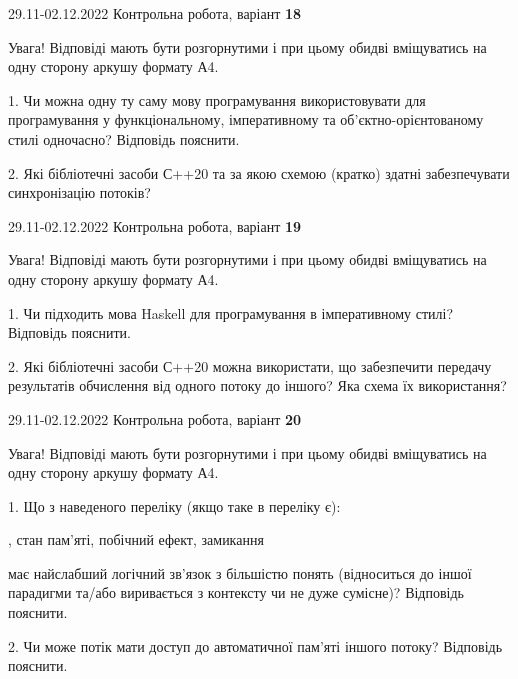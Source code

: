 \documentclass[11pt, ukrainian]{article}
\begin{document}
\vspace{4mm}



{29.11-02.12.2022 Контрольна робота, варіант  \No \textbf { 18 }\par}
Увага! Відповіді мають бути розгорнутими і при цьому обидві вміщуватись на одну сторону аркушу формату А4.

{
\begin {large}

1. Чи можна одну ту саму мову програмування використовувати для програмування у функціональному, імперативному та об’єктно-орієнтованому стилі одночасно? Відповідь пояснити.%

2. Які бібліотечні засоби С++20 та за якою схемою (кратко) здатні забезпечувати синхронізацію потоків?

\end {large}}

\vspace{4mm}



{29.11-02.12.2022 Контрольна робота, варіант  \No \textbf { 19 }\par}
Увага! Відповіді мають бути розгорнутими і при цьому обидві вміщуватись на одну сторону аркушу формату А4.

{
\begin {large}

1. Чи підходить мова Haskell для програмування в імперативному стилі? Відповідь пояснити.%

2. Які бібліотечні засоби С++20 можна використати, що забезпечити передачу результатів обчислення від одного потоку до іншого? Яка схема їх використання?

\end {large}}

\vspace{4mm}



{29.11-02.12.2022 Контрольна робота, варіант  \No \textbf { 20 }\par}
Увага! Відповіді мають бути розгорнутими і при цьому обидві вміщуватись на одну сторону аркушу формату А4.

{
\begin {large}

1. Що з наведеного переліку (якщо таке в переліку є):

\vspace{4mm}
, стан пам’яті, побічний ефект, замикання

\vspace{4mm}
має найслабший логічний зв’язок з більшістю понять (відноситься до іншої парадигми та/або виривається з контексту чи не дуже сумісне)? Відповідь пояснити.


2. Чи може потік мати доступ до автоматичної пам’яті іншого потоку? Відповідь пояснити.

\end {large}}
\end{document}
